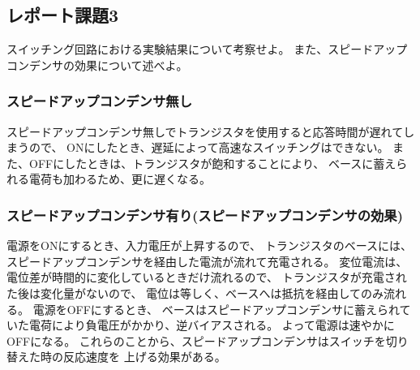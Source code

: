 \documentclass[12pt]{jarticle}
\begin{document}
\clearpage

\subsection{レポート課題3}
\begin{shadebox}
    スイッチング回路における実験結果について考察せよ。
    また、スピードアップコンデンサの効果について述べよ。
\end{shadebox}
\subsubsection*{スピードアップコンデンサ無し}
スピードアップコンデンサ無しでトランジスタを使用すると応答時間が遅れてしまうので、
ONにしたとき、遅延によって高速なスイッチングはできない。
また、OFFにしたときは、トランジスタが飽和することにより、
ベースに蓄えられる電荷も加わるため、更に遅くなる。

\subsubsection*{スピードアップコンデンサ有り(スピードアップコンデンサの効果)}
電源をONにするとき、入力電圧が上昇するので、
トランジスタのベースには、スピードアップコンデンサを経由した電流が流れて充電される。
変位電流は、電位差が時間的に変化しているときだけ流れるので、
トランジスタが充電された後は変化量がないので、
電位は等しく、ベースへは抵抗を経由してのみ流れる。
電源をOFFにするとき、
ベースはスピードアップコンデンサに蓄えられていた電荷により負電圧がかかり、逆バイアスされる。
よって電源は速やかにOFFになる。
これらのことから、スピードアップコンデンサはスイッチを切り替えた時の反応速度を
上げる効果がある。
\end{document}
